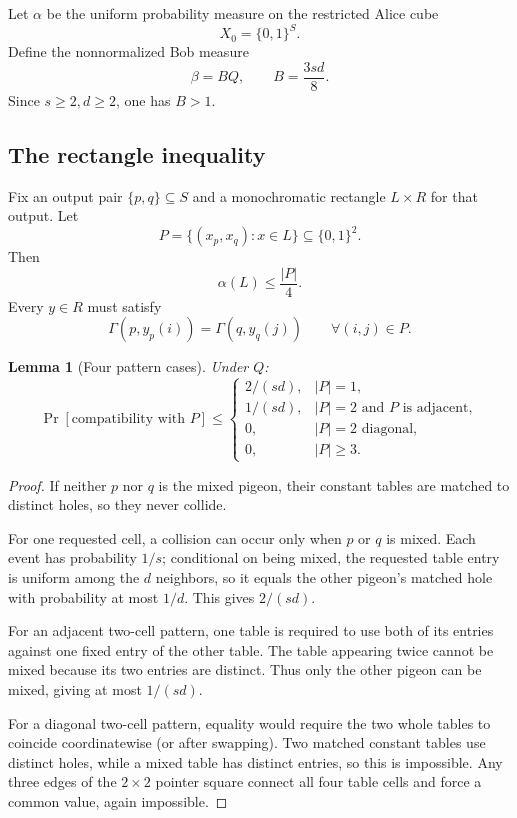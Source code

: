 \documentclass[11pt]{article}
\newtheorem{lemma}[theorem]{Lemma}
\begin{document}
Let $\alpha$ be the uniform probability measure on the restricted Alice cube
\[
X_0=\{0,1\}^{S}.
\]
Define the nonnormalized Bob measure
\[
\beta=BQ,\qquad
\boxed{B=\frac{3sd}{8}.}
\]
Since $s\ge2,d\ge2$, one has $B>1$.

\subsection{The rectangle inequality}
Fix an output pair $\{p,q\}\subseteq S$ and a monochromatic rectangle $L\times R$ for that output. Let
\[
P=\{(x_p,x_q):x\in L\}\subseteq\{0,1\}^2.
\]
Then
\[
\alpha(L)\le\frac{|P|}{4}.
\]
Every $y\in R$ must satisfy
\[
\Gamma(p,y_p(i))=\Gamma(q,y_q(j))
\qquad
\forall(i,j)\in P.
\]

\begin{lemma}[Four pattern cases]
Under $Q$:
\[
\Pr[\text{compatibility with }P]
\le
\begin{cases}
2/(sd),&|P|=1,\\
1/(sd),&|P|=2\text{ and }P\text{ is adjacent},\\
0,&|P|=2\text{ diagonal},\\
0,&|P|\ge3.
\end{cases}
\]
\end{lemma}
\begin{proof}
If neither $p$ nor $q$ is the mixed pigeon, their constant tables are matched to distinct holes, so they never collide.

For one requested cell, a collision can occur only when $p$ or $q$ is mixed. Each event has probability $1/s$; conditional on being mixed, the requested table entry is uniform among the $d$ neighbors, so it equals the other pigeon's matched hole with probability at most $1/d$. This gives $2/(sd)$.

For an adjacent two-cell pattern, one table is required to use both of its entries against one fixed entry of the other table. The table appearing twice cannot be mixed because its two entries are distinct. Thus only the other pigeon can be mixed, giving at most $1/(sd)$.

For a diagonal two-cell pattern, equality would require the two whole tables to coincide coordinatewise (or after swapping). Two matched constant tables use distinct holes, while a mixed table has distinct entries, so this is impossible. Any three edges of the $2\times2$ pointer square connect all four table cells and force a common value, again impossible.
\end{proof}
\end{document}
